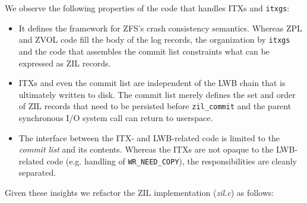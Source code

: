 \documentclass[12pt,a4paper,twoside]{book}
\begin{document}
We observe the following properties of the code that handles ITXs and \lstinline{itxgs}:
\begin{itemize}[noitemsep]
    \item It defines the framework for ZFS's crash consistency semantics.
          Whereas ZPL and ZVOL code fill the body of the log records, the organization by \lstinline{itxgs} and the code that assembles the commit list constraints what can be expressed as ZIL records.
    \item ITXs and even the commit list are independent of the LWB chain that is ultimately written to disk.
          The commit list merely defines the set and order of ZIL records that need to be persisted before \lstinline{zil_commit} and the parent synchronous I/O system call can return to userspace.
    \item The interface between the ITX- and LWB-related code is limited to the \textit{commit list} and its contents.
          Whereas the ITXs are not opaque to the LWB-related code (e.g. handling of \lstinline{WR_NEED_COPY}), the responsibilities are cleanly separated.
\end{itemize}
Given these insights we refactor the ZIL implementation (\textit{zil.c}) as follows:
\end{document}
